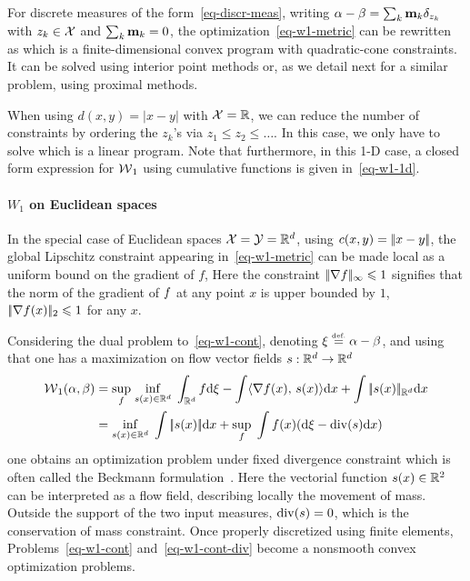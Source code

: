 For discrete measures of the form~\eqref{eq-discr-meas}, writing $\alpha-\beta = \sum_{k} \mathrm{\textbf{\upshape m}}_k \delta_{z_k}$ with $z_k \in \mathcal{X}$ and $\sum_k \mathrm{\textbf{\upshape m}}_k=0$, the optimization~\eqref{eq-w1-metric} can be rewritten as
which is a finite-dimensional convex program with quadratic-cone constraints.  It can be solved using interior point methods or, as we detail next for a similar problem, using proximal methods. 

When using $d(x,y)=|x-y|$ with $\mathcal{X}=\mathbb{R}$, we can reduce the number of constraints by ordering the $z_k$'s via $z_1 \leq z_2 \leq \ldots$.  In this case, we only have to solve
which is a linear program. 
%
Note that furthermore, in this 1-D case, a closed form expression for $\operatorname{\mathcal{W}}_1$ using cumulative functions is given in~\eqref{eq-w1-1d}.

\paragraph{$W_1$ on Euclidean spaces}

In the special case of Euclidean spaces $\mathcal{X}=\mathcal{Y}=\mathbb{R}^d$, using $c(x,y) = |\!| x-y |\!|$, the global Lipschitz constraint appearing in~\eqref{eq-w1-metric} can be made local as a uniform bound on the gradient of $f$, 
Here the constraint $|\!| \nabla f |\!|_\infty \leqslant 1$ signifies that the norm of the gradient of $f$ at any point $x$ is upper bounded by $1$, $|\!| \nabla f(x) |\!|_2 \leqslant 1$ for any $x$.

Considering the dual problem to~\eqref{eq-w1-cont}, denoting $\xi \stackrel{\mbox{\upshape\tiny def.}}{=} \alpha-\beta$, and using that
one has a maximization on flow vector fields $s :  \mathbb{R}^d \rightarrow \mathbb{R}^d$ 
\begin{align*}
	\operatorname{\mathcal{W}}_1(\alpha,\beta) &= 
	\underset{f}{\sup}\; \underset{s(x) \in \mathbb{R}^d}{\inf}\; \int_{\mathbb{R}^d} f \mathrm{d}\xi - \int \langle \nabla f(x),\,s(x)\rangle \mathrm{d} x + \int |\!| s(x) |\!|_{\mathbb{R}^d} \mathrm{d} x \\
	&= 
	\underset{s(x) \in \mathbb{R}^d}{\inf}\; \int |\!| s(x) |\!| \mathrm{d} x
		+ \underset{f}{\sup}\; \int f(x) ( \mathrm{d} \xi - \operatorname{div}(s) \mathrm{d} x) 
\end{align*}
one obtains an optimization problem under fixed divergence constraint
which is often called the Beckmann formulation~\cite{Beckmann52}.
%
Here the vectorial function $s(x) \in \mathbb{R}^2$ can be interpreted as a flow field, describing locally the movement of mass. Outside the support of the two input measures, $\operatorname{div}(s)=0$, which is the conservation of mass constraint. 
%
Once properly discretized using finite elements, Problems~\eqref{eq-w1-cont} and~\eqref{eq-w1-cont-div} become a nonsmooth convex optimization problems. 

